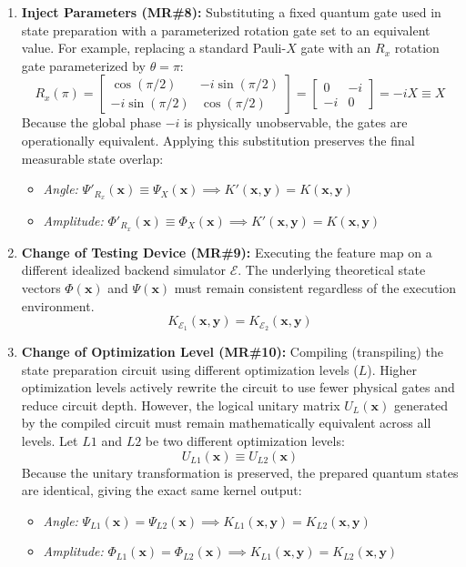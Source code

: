 \documentclass[12pt,a4paper]{article}
\begin{document}
\begin{enumerate}
		\item \textbf{Inject Parameters (MR\#8):} Substituting a fixed quantum gate used in state preparation with a parameterized rotation gate set to an equivalent value. For example, replacing a standard Pauli-$X$ gate with an $R_x$ rotation gate parameterized by $\theta = \pi$:
		$$ R_x(\pi) = \begin{bmatrix} \cos(\pi/2) & -i\sin(\pi/2) \\ -i\sin(\pi/2) & \cos(\pi/2) \end{bmatrix} = \begin{bmatrix} 0 & -i \\ -i & 0 \end{bmatrix} = -iX \equiv X $$
		Because the global phase $-i$ is physically unobservable, the gates are operationally equivalent. Applying this substitution preserves the final measurable state overlap:
		\begin{itemize}
			\item \textit{Angle:} $\Psi'_{R_x}(\mathbf{x}) \equiv \Psi_X(\mathbf{x}) \implies K'(\mathbf{x}, \mathbf{y}) = K(\mathbf{x}, \mathbf{y})$
			\item \textit{Amplitude:} $\Phi'_{R_x}(\mathbf{x}) \equiv \Phi_X(\mathbf{x}) \implies K'(\mathbf{x}, \mathbf{y}) = K(\mathbf{x}, \mathbf{y})$
		\end{itemize}
		
			\item \textbf{Change of Testing Device (MR\#9):} Executing the feature map on a different idealized backend simulator $\mathcal{E}$. The underlying theoretical state vectors $\Phi(\mathbf{x})$ and $\Psi(\mathbf{x})$ must remain consistent regardless of the execution environment.
			$$ K_{\mathcal{E}_1}(\mathbf{x}, \mathbf{y}) = K_{\mathcal{E}_2}(\mathbf{x}, \mathbf{y}) $$
			
		\item \textbf{Change of Optimization Level (MR\#10):} Compiling (transpiling) the state preparation circuit using different optimization levels ($L$). Higher optimization levels actively rewrite the circuit to use fewer physical gates and reduce circuit depth. However, the logical unitary matrix $U_L(\mathbf{x})$ generated by the compiled circuit must remain mathematically equivalent across all levels. Let $L1$ and $L2$ be two different optimization levels:
		$$ U_{L1}(\mathbf{x}) \equiv U_{L2}(\mathbf{x}) $$
		Because the unitary transformation is preserved, the prepared quantum states are identical, giving the exact same kernel output:
		\begin{itemize}
			\item \textit{Angle:} $\Psi_{L1}(\mathbf{x}) = \Psi_{L2}(\mathbf{x}) \implies K_{L1}(\mathbf{x}, \mathbf{y}) = K_{L2}(\mathbf{x}, \mathbf{y})$
			\item \textit{Amplitude:} $\Phi_{L1}(\mathbf{x}) = \Phi_{L2}(\mathbf{x}) \implies K_{L1}(\mathbf{x}, \mathbf{y}) = K_{L2}(\mathbf{x}, \mathbf{y})$
		\end{itemize}
			

\end{enumerate}
\end{document}
